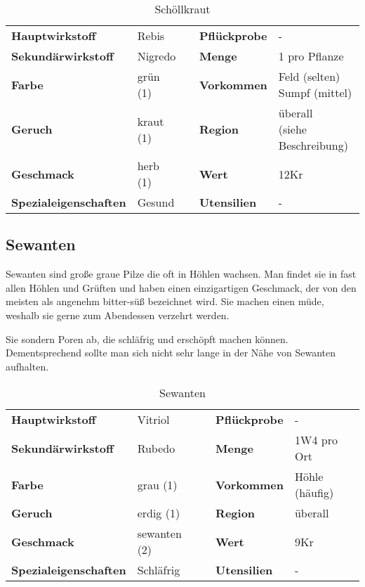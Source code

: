 \begin{table}[h] 
\begin{center} 
\begin{tabular}{|l|l|p{1cm}|l|l|} 
  	\cline{1-2} \cline{4-5} 
  	\textbf{Hauptwirkstoff} & Rebis && \textbf{Pflückprobe} & - \\ \cline{1-2} \cline{4-5} 
  	\textbf{Sekundärwirkstoff} & Nigredo && \textbf{Menge} & 1 pro Pflanze \\ \cline{1-2} \cline{4-5} 
  	\textbf{Farbe} & grün (1) && \textbf{Vorkommen} & \brcell{Feld (selten) \\ Sumpf (mittel)} \\ \cline{1-2} \cline{4-5} 
  	\textbf{Geruch} & kraut (1) && \textbf{Region} & \brcell{überall \\ (siehe Beschreibung)} \\ \cline{1-2} \cline{4-5} 
  	\textbf{Geschmack} & herb (1) && \textbf{Wert} & 12Kr \\ \cline{1-2} \cline{4-5} 
  	\textbf{Spezialeigenschaften} & Gesund && \textbf{Utensilien} & - \\ \cline{1-2} \cline{4-5} 
\end{tabular} 
\end{center} 
\caption{Schöllkraut} 
\label{tab:schoellkraut} 
\end{table}

\subsection{Sewanten}
Sewanten sind große graue Pilze die oft in Höhlen wachsen. Man findet sie in fast allen Höhlen und Grüften und haben einen einzigartigen Geschmack, der von den meisten als angenehm bitter-süß bezeichnet wird. Sie machen einen müde, weshalb sie gerne zum Abendessen verzehrt werden.

Sie sondern Poren ab, die schläfrig und erschöpft machen können. Dementsprechend sollte man sich nicht sehr lange in der Nähe von Sewanten aufhalten.

\begin{table}[h] 
\begin{center} 
\begin{tabular}{|l|l|p{1cm}|l|l|} 
  	\cline{1-2} \cline{4-5} 
  	\textbf{Hauptwirkstoff} & Vitriol && \textbf{Pflückprobe} & - \\ \cline{1-2} \cline{4-5} 
  	\textbf{Sekundärwirkstoff} & Rubedo && \textbf{Menge} & 1W4 pro Ort \\ \cline{1-2} \cline{4-5} 
  	\textbf{Farbe} & grau (1) && \textbf{Vorkommen} & Höhle (häufig) \\ \cline{1-2} \cline{4-5} 
  	\textbf{Geruch} & erdig (1) && \textbf{Region} & überall \\ \cline{1-2} \cline{4-5} 
  	\textbf{Geschmack} & sewanten (2) && \textbf{Wert} & 9Kr \\ \cline{1-2} \cline{4-5} 
  	\textbf{Spezialeigenschaften} & Schläfrig && \textbf{Utensilien} & - \\ \cline{1-2} \cline{4-5} 
\end{tabular} 
\end{center} 
\caption{Sewanten} 
\label{tab:sewanten} 
\end{table}


